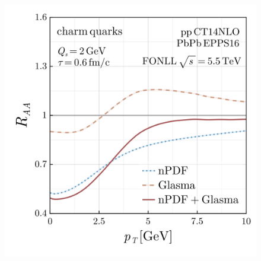 \documentclass[aspectratio=169,11pt,usenames,dvipsnames]{beamer}
\begin{document}
\begin{frame}
\begin{center}
\begin{columns}[onlytextwidth,t]
\begin{figure}
                \includegraphics[width=\columnwidth]{images/clean_raa_tau_0.6_charm_quark_Qs_2.0_fonll_pdf_vs_npdf_v2.png}
                \captionsetup{justification=centering}
            \end{figure}
        \end{columns}    
    \end{center}
\end{frame}
\end{document}
